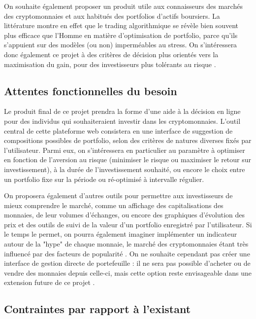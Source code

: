 \documentclass[a4paper]{article}
\begin{document}
On souhaite également proposer un produit utile aux connaisseurs des marchés des cryptomonnaies et aux habitués des portfolios d'actifs boursiers. La littérature \cite{Chaboud2014} montre en effet que le trading algorithmique se révèle bien souvent plus efficace que l'Homme en matière d'optimisation de portfolio, parce qu'ils s'appuient sur des modèles (ou non) imperméables au stress. On s'intéressera donc également ce projet à des critères de décision plus orientés vers la maximisation du gain, pour des investisseurs plus tolérants au risque \cite{Li2014}.

\subsection{Attentes fonctionnelles du besoin}

Le produit final de ce projet prendra la forme d'une aide à la décision en ligne pour des individus qui souhaiteraient investir dans les cryptomonnaies. L'outil central de cette plateforme web consistera en une interface de suggestion de compositions possibles de portfolio, selon des critères de natures diverses fixés par l'utilisateur. Parmi eux, on s'intéressera en particulier au paramètre à optimiser en fonction de l'aversion au risque (minimiser le risque ou maximiser le retour sur investissement), à la durée de l'investissement souhaité, ou encore le choix entre un portfolio fixe sur la période ou ré-optimisé à intervalle régulier.

On proposera également d'autres outils pour permettre aux investisseurs de mieux comprendre le marché, comme un affichage des capitalisations des monnaies, de leur volumes d'échanges, ou encore des graphiques d'évolution des prix et des outils de suivi de la valeur d'un portfolio enregistré par l'utilisateur. Si le temps le permet, on pourra également imaginer implémenter un indicateur autour de la "hype" de chaque monnaie, le marché des cryptomonnaies étant très influencé par des facteurs de popularité \cite{Colianni2015}. On ne souhaite cependant pas créer une interface de gestion directe de portefeuille : il ne sera pas possible d'acheter ou de vendre des monnaies depuis celle-ci, mais cette option  reste envisageable dans une extension future de ce projet \cite{Madan2014}.

\subsection{Contraintes par rapport à l'existant}
\end{document}
